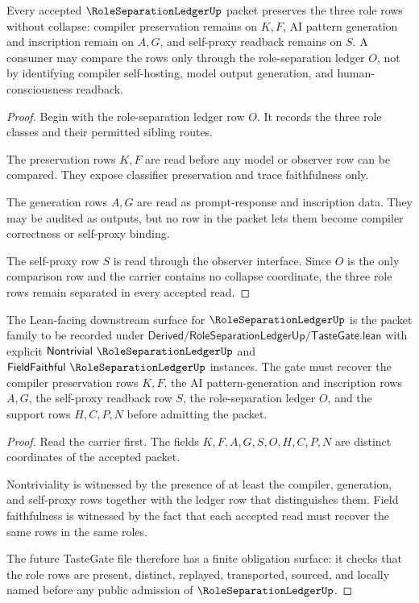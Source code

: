 \begin{theorem}
\label{thm:role-separation-ledger-role-noncollapse}
Every accepted $\RoleSeparationLedgerUp$ packet preserves the three role rows without collapse: compiler preservation remains on $K,F$, AI pattern generation and inscription remain on $A,G$, and self-proxy readback remains on $S$. A consumer may compare the rows only through the role-separation ledger $O$, not by identifying compiler self-hosting, model output generation, and human-consciousness readback.
\end{theorem}
\begin{proof}
Begin with the role-separation ledger row $O$. It records the three role classes and their permitted sibling routes.

The preservation rows $K,F$ are read before any model or observer row can be compared. They expose classifier preservation and trace faithfulness only.

The generation rows $A,G$ are read as prompt-response and inscription data. They may be audited as outputs, but no row in the packet lets them become compiler correctness or self-proxy binding.

The self-proxy row $S$ is read through the observer interface. Since $O$ is the only comparison row and the carrier contains no collapse coordinate, the three role rows remain separated in every accepted read.
\end{proof}

\begin{theorem}
\label{thm:role-separation-ledger-tastegate-target}
The Lean-facing downstream surface for $\RoleSeparationLedgerUp$ is the packet family to be recorded under $\mathsf{Derived/RoleSeparationLedgerUp/TasteGate.lean}$ with explicit $\mathsf{Nontrivial}\ \RoleSeparationLedgerUp$ and $\mathsf{FieldFaithful}\ \RoleSeparationLedgerUp$ instances. The gate must recover the compiler preservation rows $K,F$, the AI pattern-generation and inscription rows $A,G$, the self-proxy readback row $S$, the role-separation ledger $O$, and the support rows $H,C,P,N$ before admitting the packet.
\end{theorem}
\begin{proof}
Read the carrier first. The fields $K,F,A,G,S,O,H,C,P,N$ are distinct coordinates of the accepted packet.

Nontriviality is witnessed by the presence of at least the compiler, generation, and self-proxy rows together with the ledger row that distinguishes them. Field faithfulness is witnessed by the fact that each accepted read must recover the same rows in the same roles.

The future TasteGate file therefore has a finite obligation surface: it checks that the role rows are present, distinct, replayed, transported, sourced, and locally named before any public admission of $\RoleSeparationLedgerUp$.
\end{proof}

